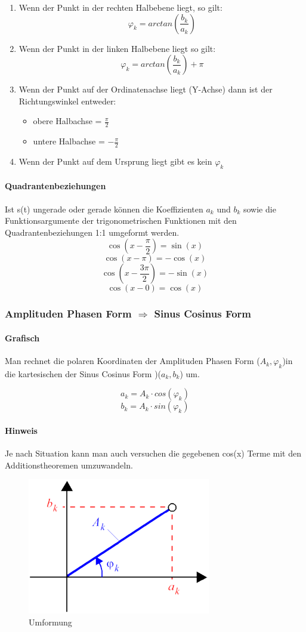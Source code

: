 \begin{enumerate}
	\item Wenn der Punkt in der rechten Halbebene liegt, so gilt:
	\[\varphi_k = arctan(\frac{b_k}{a_k})\]
	\item Wenn der Punkt in der linken Halbebene liegt so gilt:
	\[\varphi_k = arctan(\frac{b_k}{a_k}) + \pi \]
	\item Wenn der Punkt auf der Ordinatenachse liegt (Y-Achse) dann ist der Richtungswinkel entweder:
	\begin{itemize}
		\item obere Halbachse = $\frac{\pi}{2}$
		\item untere Halbachse = $-\frac{\pi}{2}$
	\end{itemize}
	\item Wenn der Punkt auf dem Ursprung liegt gibt es kein $\varphi_k$
\end{enumerate}

\paragraph{Quadrantenbeziehungen}
Ist s(t) ungerade oder gerade können die Koeffizienten $a_k$ und $b_k$ sowie die Funktionsargumente der trigonometrischen Funktionen mit den Quadrantenbeziehungen 1:1 umgeformt werden.
\[
\cos(x - \frac{\pi}{2}) = \sin(x)
\]
\[
\cos(x - \pi) = -\cos(x)
\]
\[
\cos(x - \frac{3\pi}{2}) = -\sin(x)
\]
\[
\cos(x - 0) = \cos(x)
\]

\subsubsection{Amplituden Phasen Form $\Rightarrow$ Sinus Cosinus Form}
\paragraph{Grafisch}
Man rechnet die polaren Koordinaten der Amplituden Phasen Form ($A_k, \varphi_k$)in die kartesischen der Sinus Cosinus Form )($a_k, b_k$) um. 

\[ a_k = A_k \cdot cos(\varphi_k) \]
\[ b_k = A_k \cdot sin(\varphi_k) \]

\paragraph{Hinweis}
Je nach Situation kann man auch versuchen die gegebenen cos(x) Terme mit den Additionstheoremen umzuwandeln.

\begin{figure}[h]
\centering
\includegraphics[width=0.3\linewidth]{images/sincos_ampform_transformation}
\caption{Umformung}
\end{figure}

